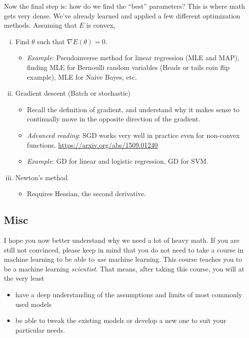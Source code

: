 \documentclass{discussion}
\providecommand{\tightlist}{%
\setlength{\itemsep}{2pt}\setlength{\parskip}{0pt}}
\begin{document}
Now the final step is: how do we find the ``best''
parameters? This is where math gets very dense. We've already learned and applied a few different optimization methods. Assuming that \(E\) is convex,

\begin{enumerate}[(i)]
\tightlist
\item
  Find \(\theta\) such that \(\nabla E(\theta) = 0\).
  \begin{itemize}
  \tightlist
  \item
    \emph{Example}: Pseudoinverse method for linear
    regression (MLE and MAP), finding MLE for Bernoulli random variables (Heads or tails coin flip example), MLE for Naive Bayes, etc.
  \end{itemize}
\item
  Gradient descent (Batch or stochastic)

  \begin{itemize}
  \tightlist
  \item
    Recall the definition of gradient, and understand why it makes sense
    to continually move in the opposite direction of the gradient.
  \item
    \emph{Advanced reading}: SGD works very well in practice
    even for non-convex functions. \url{https://arxiv.org/abs/1509.01240}
  \item
    \emph{Example}: GD for linear and logistic regression, GD for SVM.
  \end{itemize}
\item
  Newton's method
  \begin{itemize}
  \tightlist
  \item
    Requires Hessian, the second derivative.
  \end{itemize}
\end{enumerate}

    \subsection{Misc}\label{misc}

I hope you now better understand why we need a lot of heavy math. If you are still not convinced, please keep in mind that you do not need to take a course in machine learning to be able to \emph{use} machine learning. This course teaches you to be a machine learning
\emph{scientist}. That means, after taking this course, you will at the very least
\begin{itemize}
  \tightlist
  \item have a deep understanding of the assumptions and limits of most commonly used models
  \item be able to tweak the existing models or develop a new one to suit
your particular needs.
\end{itemize}
\end{document}
